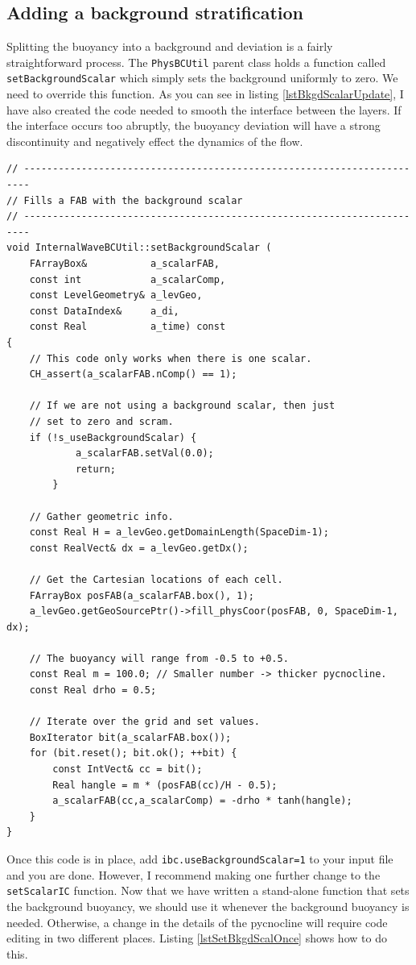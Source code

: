 \documentclass[12pt]{article}
\begin{document}
\subsection{Adding a background stratification}
Splitting the buoyancy into a background and deviation is a fairly straightforward process. The \texttt{PhysBCUtil} parent class holds a function called \texttt{setBackgroundScalar} which simply sets the background uniformly to zero. We need to override this function. As you can see in listing \ref{lstBkgdScalarUpdate}, I have also created the code needed to smooth the interface between the layers. If the interface occurs too abruptly, the buoyancy deviation will have a strong discontinuity and negatively effect the dynamics of the flow.
\begin{lstlisting}[caption={The updates to \texttt{InternalWaveBCUtil} needed to split the buoyancy.},label=lstBkgdScalarUpdate]
// -----------------------------------------------------------------------
// Fills a FAB with the background scalar
// -----------------------------------------------------------------------
void InternalWaveBCUtil::setBackgroundScalar (
	FArrayBox&           a_scalarFAB,
	const int            a_scalarComp,
	const LevelGeometry& a_levGeo,
	const DataIndex&     a_di,
	const Real           a_time) const
{
    // This code only works when there is one scalar.
    CH_assert(a_scalarFAB.nComp() == 1);

    // If we are not using a background scalar, then just
    // set to zero and scram.
    if (!s_useBackgroundScalar) {
            a_scalarFAB.setVal(0.0);
            return;
        }

	// Gather geometric info.
    const Real H = a_levGeo.getDomainLength(SpaceDim-1);
    const RealVect& dx = a_levGeo.getDx();

    // Get the Cartesian locations of each cell.
    FArrayBox posFAB(a_scalarFAB.box(), 1);
    a_levGeo.getGeoSourcePtr()->fill_physCoor(posFAB, 0, SpaceDim-1, dx);

    // The buoyancy will range from -0.5 to +0.5.
    const Real m = 100.0; // Smaller number -> thicker pycnocline.
    const Real drho = 0.5;

    // Iterate over the grid and set values.
    BoxIterator bit(a_scalarFAB.box());
    for (bit.reset(); bit.ok(); ++bit) {
        const IntVect& cc = bit();
        Real hangle = m * (posFAB(cc)/H - 0.5);
        a_scalarFAB(cc,a_scalarComp) = -drho * tanh(hangle);
    }
}
\end{lstlisting}
Once this code is in place, add \texttt{ibc.useBackgroundScalar=1} to your input file and you are done. However, I recommend making one further change to the \texttt{setScalarIC} function. Now that we have written a stand-alone function that sets the background buoyancy, we should use it whenever the background buoyancy is needed. Otherwise, a change in the details of the pycnocline will require code editing in two different places. Listing \ref{lstSetBkgdScalOnce} shows how to do this.
\end{document}
